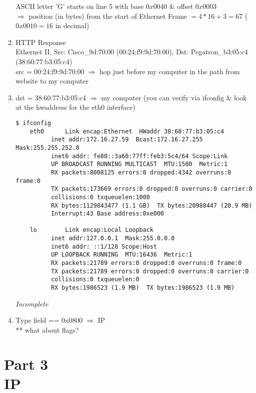 \documentclass[a4,11pt]{article}
\begin{document}
\begin{enumerate}
  ASCII letter 'G' starts on line 5 with base $0x0040$ \& offset $0x0003$ \\
  $\Rightarrow$ position (in bytes) from the start of Ethernet Frame $= 4*16+3 = 67$ ($0x0010 = 16$ in decimal)

  \item HTTP Response \\
  Ethernet II, Src: Cisco\_9d:70:00 (00:24:f9:9d:70:00), Dst: Pegatron\_b3:05:c4 (38:60:77:b3:05:c4) \\
  src = 00:24:f9:9d:70:00 $\Rightarrow$ hop just before my computer in the path from website to my computer \\

  \item dst = 38:60:77:b3:05:c4 $\Rightarrow$ my computer (you can verify via ifconfig \& look at the hwaddress for the eth0 interface)

  \begin{adjustwidth}{-2cm}{}
  \begin{lstlisting}[style=bash]
    $ ifconfig
    eth0      Link encap:Ethernet  HWaddr 38:60:77:b3:05:c4  
	      inet addr:172.16.27.59  Bcast:172.16.27.255  Mask:255.255.252.0
	      inet6 addr: fe80::3a60:77ff:feb3:5c4/64 Scope:Link
	      UP BROADCAST RUNNING MULTICAST  MTU:1500  Metric:1
	      RX packets:8008125 errors:0 dropped:4342 overruns:0 frame:0
	      TX packets:173669 errors:0 dropped:0 overruns:0 carrier:0
	      collisions:0 txqueuelen:1000 
	      RX bytes:1129843477 (1.1 GB)  TX bytes:20988447 (20.9 MB)
	      Interrupt:43 Base address:0xe000 

    lo        Link encap:Local Loopback  
	      inet addr:127.0.0.1  Mask:255.0.0.0
	      inet6 addr: ::1/128 Scope:Host
	      UP LOOPBACK RUNNING  MTU:16436  Metric:1
	      RX packets:21789 errors:0 dropped:0 overruns:0 frame:0
	      TX packets:21789 errors:0 dropped:0 overruns:0 carrier:0
	      collisions:0 txqueuelen:0 
	      RX bytes:1986523 (1.9 MB)  TX bytes:1986523 (1.9 MB)
  \end{lstlisting}
  \end{adjustwidth}

  \textit{Incomplete}
  \item Type field == 0x0800 $\Rightarrow$ IP \\
    ** what about flags?

\end{enumerate}

	  
\section{Part 3\\
	  IP}
\end{document}
